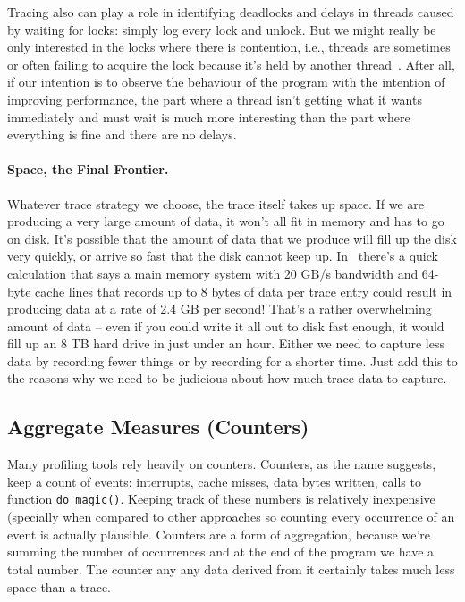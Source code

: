 \documentclass[a4paper]{report}
\begin{document}
Tracing also can play a role in identifying deadlocks and delays in threads caused by waiting for locks: simply log every lock and unlock. But we might really be only interested in the locks where there is contention, i.e., threads are sometimes or often failing to acquire the lock because it's held by another thread~\cite{usd}. After all, if our intention is to observe the behaviour of the program with the intention of improving performance, the part where a thread isn't getting what it wants immediately and must wait is much more interesting than the part where everything is fine and there are no delays.

\paragraph{Space, the Final Frontier.} Whatever trace strategy we choose, the trace itself takes up space. If we are producing a very large amount of data, it won't all fit in memory and has to go on disk. It's possible that the amount of data that we produce will fill up the disk very quickly, or arrive so fast that the disk cannot keep up. In~\cite{usd} there's a quick calculation that says a main memory system with 20 GB/s bandwidth and 64-byte cache lines that records up to 8 bytes of data per trace entry could result in producing data at a rate of 2.4 GB per second! That's a rather overwhelming amount of data -- even if you could write it all out to disk fast enough, it would fill up an 8 TB hard drive in just under an hour. Either we need to capture less data by recording fewer things or by recording for a shorter time. Just add this to the reasons why we need to be judicious about how much trace data to capture.

\subsection*{Aggregate Measures (Counters)}
Many profiling tools rely heavily on counters. Counters, as the name suggests, keep a count of events: interrupts, cache misses, data bytes written, calls to function \texttt{do\_magic()}. Keeping track of these numbers is relatively inexpensive (specially when compared to other approaches so counting every occurrence of an event is actually plausible. Counters are a form of aggregation, because we're summing the number of occurrences and at the end of the program we have a total number. The counter any any data derived from it certainly takes much less space than a trace.
\end{document}
